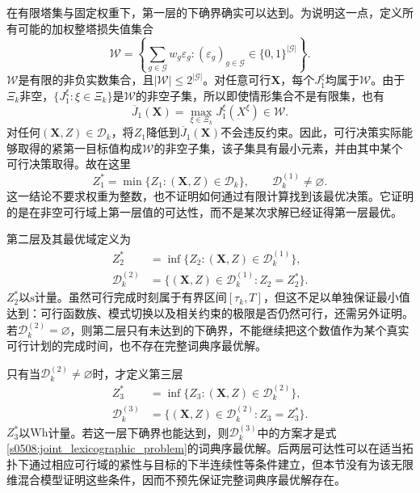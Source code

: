 在有限塔集与固定权重下，第一层的下确界确实可以达到。为说明这一点，定义所有可能的加权整塔损失值集合
\begin{equation}
 \mathcal W=
 \left\{\sum_{g\in\mathcal G}w_g\varepsilon_g:
          (\varepsilon_g)_{g\in\mathcal G}
                 \in\{0,1\}^{|\mathcal G|}\right\}.
 \label{s0508:finite_loss_values}
\end{equation}
$\mathcal W$是有限的非负实数集合，且$|\mathcal W|\le2^{|\mathcal G|}$。对任意可行$\mathbf X$，每个$J_1^\xi$均属于$\mathcal W$。由于$\Xi_k$非空，$\{J_1^\xi:\xi\in\Xi_k\}$是$\mathcal W$的非空子集，所以即使情形集合不是有限集，也有
\begin{equation}
 \overline J_1(\mathbf X)
 =\max_{\xi\in\Xi_k}J_1^\xi(X^\xi)\in\mathcal W.
 \label{s0508:finite_robust_loss}
\end{equation}
对任何$(\mathbf X,Z)\in\mathcal D_k$，将$Z_1$降低到$\overline J_1(\mathbf X)$不会违反约束。因此，可行决策实际能够取得的紧第一目标值构成$\mathcal W$的非空子集，该子集具有最小元素，并由其中某个可行决策取得。故在这里
\begin{equation}
 Z_1^*=
 \min\{Z_1:(\mathbf X,Z)\in\mathcal D_k\},
 \qquad \mathcal D_k^{(1)}\ne\varnothing.
 \label{s0508:first_attainment}
\end{equation}
这一结论不要求权重为整数，也不证明如何通过有限计算找到该最优决策。它证明的是在非空可行域上第一层值的可达性，而不是某次求解已经证得第一层最优。

第二层及其最优域定义为
\begin{align}
 Z_2^*&=\inf\{Z_2:(\mathbf X,Z)\in\mathcal D_k^{(1)}\},
 \label{s0508:second_optimum}\\
 \mathcal D_k^{(2)}
 &=\{(\mathbf X,Z)\in\mathcal D_k^{(1)}:Z_2=Z_2^*\}.
 \label{s0508:second_optimal_domain}
\end{align}
$Z_2^*$以$\mathrm s$计量。虽然可行完成时刻属于有界区间$[\tau_k,T]$，但这不足以单独保证最小值达到：可行函数族、模式切换以及相关约束的极限是否仍然可行，还需另外证明。若$\mathcal D_k^{(2)}=\varnothing$，则第二层只有未达到的下确界，不能继续把这个数值作为某个真实可行计划的完成时间，也不存在完整词典序最优解。

只有当$\mathcal D_k^{(2)}\ne\varnothing$时，才定义第三层
\begin{align}
 Z_3^*&=\inf\{Z_3:(\mathbf X,Z)\in\mathcal D_k^{(2)}\},
 \label{s0508:third_optimum}\\
 \mathcal D_k^{(3)}
 &=\{(\mathbf X,Z)\in\mathcal D_k^{(2)}:Z_3=Z_3^*\}.
 \label{s0508:third_optimal_domain}
\end{align}
$Z_3^*$以$\mathrm{Wh}$计量。若这一层下确界也能达到，则$\mathcal D_k^{(3)}$中的方案才是式\eqref{s0508:joint_lexicographic_problem}的词典序最优解。后两层可达性可以在适当拓扑下通过相应可行域的紧性与目标的下半连续性等条件建立，但本节没有为该无限维混合模型证明这些条件，因而不预先保证完整词典序最优解存在。


